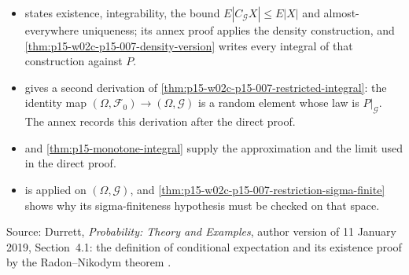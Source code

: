 \begin{itemize}
\item {} states existence,
      integrability, the bound \(E|C_{\mathcal G}X|\leq E|X|\) and
      almost-everywhere uniqueness; its annex proof applies the density
      construction, and \cref{thm:p15-w02c-p15-007-density-version}
      writes every integral of that construction against \(P\).
\item {} gives a second derivation of
      \cref{thm:p15-w02c-p15-007-restricted-integral}: the identity map
      \((\Omega,\mathcal F_0)\to(\Omega,\mathcal G)\) is a random element
      whose law is \(P|_{\mathcal G}\). The annex records this derivation
      after the direct proof.
\item {} and \cref{thm:p15-monotone-integral}
      supply the approximation and the limit used in the direct proof.
\item {} is applied on \((\Omega,\mathcal G)\),
      and \cref{thm:p15-w02c-p15-007-restriction-sigma-finite} shows why its
      sigma-finiteness hypothesis must be checked on that space.
\end{itemize}

Source: Durrett, \emph{Probability: Theory and Examples}, author version
of 11 January 2019, Section~4.1: the definition of conditional
expectation \cite[pp.~205--206]{DurrettPTEAuthor2019} and its existence
proof by the Radon--Nikodym theorem \cite[p.~207]{DurrettPTEAuthor2019}.
